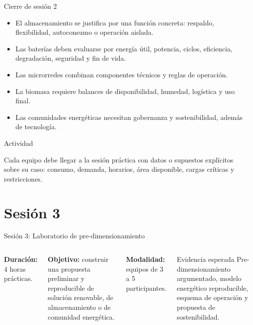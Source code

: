 \documentclass[aspectratio=169,10pt]{beamer}
\newcommand{\actividad}[1]{
\begin{alertblock}{Actividad}
#1
\end{alertblock}
}
\begin{document}
\begin{frame}{Cierre de sesión 2}
\begin{itemize}
    \item El almacenamiento se justifica por una función concreta: respaldo, flexibilidad, autoconsumo o operación aislada.
    \item Las baterías deben evaluarse por energía útil, potencia, ciclos, eficiencia, degradación, seguridad y fin de vida.
    \item Las microrredes combinan componentes técnicos y reglas de operación.
    \item La biomasa requiere balances de disponibilidad, humedad, logística y uso final.
    \item Las comunidades energéticas necesitan gobernanza y sostenibilidad, además de tecnología.
\end{itemize}

\actividad{
Cada equipo debe llegar a la sesión práctica con datos o supuestos explícitos sobre su caso: consumo, demanda, horarios, área disponible, cargas críticas y restricciones.
}
\end{frame}

\section{Sesión 3}

\begin{frame}{Sesión 3: Laboratorio de pre-dimensionamiento}
\begin{columns}
\textbf{Duración:} 4 horas prácticas.

\vspace{0.3cm}

\textbf{Objetivo:} construir una propuesta preliminar y reproducible de solución renovable, de almacenamiento o de comunidad energética.

\vspace{0.3cm}

\textbf{Modalidad:} equipos de 3 a 5 participantes.

\begin{block}{Evidencia esperada}
Pre-dimensionamiento argumentado, modelo energético reproducible, esquema de operación y propuesta de sostenibilidad.
\end{block}
\end{columns}
\end{frame}
\end{document}
